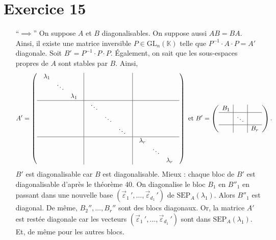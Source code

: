 \section{Exercice 15}

\begin{itemize}
	\item[``$\implies$''] On suppose $A$\/ et $B$\/ diagonalisables. On suppose aussi $AB = BA$. Ainsi, il existe une matrice inversible $P \in \mathrm{GL}_n(\mathds{K})$\/ telle que $P^{-1}\cdot A\cdot P = A'$\/ diagonale.
		Soit $B' = P^{-1}\cdot P\cdot P$. Également, on sait que les sous-espaces propres de $A$\/ sont stables par $B$. Ainsi, \[
			A' = \left(\begin{array}{c|c|c}
				\begin{array}{ccc}
					\lambda_1\\
					&\ddots\\
					&&\lambda_1
				\end{array}&\\ \hline
				&\begin{array}{ccc}
					\ddots\\
					&\ddots\\
					&&\ddots
				\end{array}\\ \hline
				&&
				\begin{array}{ccc}
					\lambda_r\\
					&\ddots\\
					&&\lambda_r
				\end{array}
			\end{array}\right) \text{ et }
			B' = \left(\begin{array}{c|c|c}
				B_1&\\ \hline
				&\ddots\\ \hline
				&&B_r
			\end{array}\right)
		.\]
		$B'$\/ est diagonalisable car $B$\/ est diagonalisable. Mieux : chaque bloc de $B'$\/ est diagonalisable d'après le théorème 40. On diagonalise le bloc $B_1$\/ en $B''_1$\/ en passant dans une nouvelle base $(\vec{\varepsilon}_1\,', \ldots, \vec{\varepsilon}_{d_1}\,')$ de $\mathrm{SEP}_A(\lambda_1)$. Alors $B''_1$\/ est diagonal. De même, $B_2'', \ldots, B_r''$\/ sont des blocs diagonaux. Or, la matrice $A'$\/ est restée diagonale car les vecteurs $(\vec{\varepsilon}_1\,', \ldots, \vec{\varepsilon}_{d_1}\,')$\/ sont dans $\mathrm{SEP}_A(\lambda_1)$. Et, de même pour les autres blocs.
\end{itemize}

